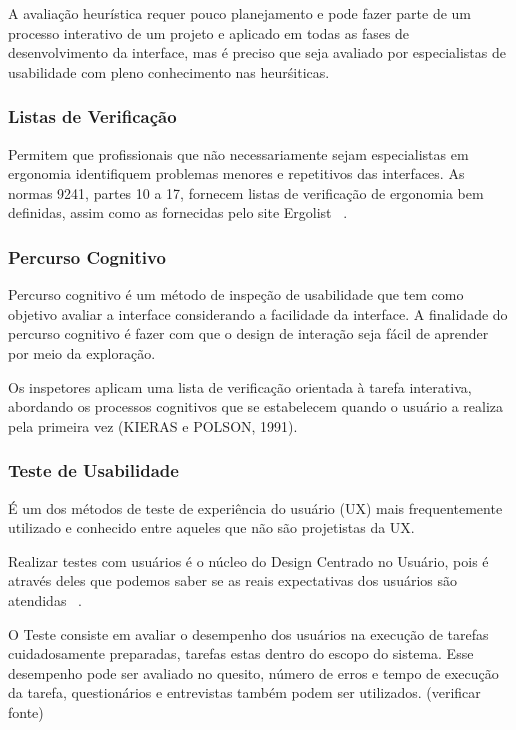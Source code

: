 	A avaliação heurística requer pouco planejamento e pode fazer parte de um processo interativo de um projeto e aplicado em todas as fases de desenvolvimento da interface, mas é preciso que seja avaliado por especialistas de usabilidade com pleno conhecimento nas heurśiticas.
	

\subsubsection{Listas de Verificação}

	Permitem que profissionais que não necessariamente sejam especialistas em ergonomia identifiquem problemas menores e repetitivos das interfaces. As normas 9241, partes 10 a 17, fornecem listas de verificação de ergonomia bem definidas, assim como as fornecidas pelo site Ergolist ~\cite{cybis2010}.
	
	

\subsubsection{Percurso Cognitivo}

Percurso cognitivo é um método de inspeção de usabilidade que tem como objetivo avaliar a interface considerando a facilidade da interface. A finalidade do percurso cognitivo é fazer com que o design de interação seja fácil de aprender por meio da exploração.

Os inspetores aplicam uma lista de verificação orientada à tarefa interativa, abordando os processos cognitivos que se estabelecem quando o usuário a realiza pela primeira vez (KIERAS e POLSON, 1991).%
	

\subsubsection{Teste de Usabilidade}

	É um dos métodos de teste de experiência do usuário (UX) mais frequentemente utilizado e conhecido entre aqueles que não são projetistas da UX.

	Realizar testes com usuários é o núcleo do Design Centrado no Usuário, pois é através deles que podemos saber se as reais expectativas dos usuários são atendidas ~\cite{santos2012}.

	O Teste consiste em avaliar o desempenho dos usuários na execução de tarefas cuidadosamente preparadas, tarefas estas dentro do escopo do sistema. Esse desempenho pode ser avaliado no quesito, número de erros e tempo de execução da tarefa, questionários e entrevistas também podem ser utilizados. (verificar fonte)

